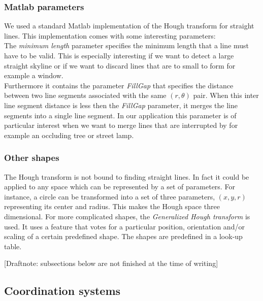 \subsubsection{Matlab parameters}
We used a standard Matlab implementation of the Hough transform for straight lines.  This implementation comes with some interesting parameters:\\

	The \emph{minimum length} parameter specifies the minimum length that a line must have to be valid. This is especially interesting if we want to detect a large straight skyline or if we want to discard lines that are to small to form for example a window.\\

	Furthermore it contains the parameter \emph{FillGap} that specifies the distance
	between two line segments associated with the same $(r, \theta)$ pair.
	When this inter line segment distance is less then the \emph{FillGap} parameter, it merges the line segments into a single line segment. In our application this parameter is of particular interest when we want to merge lines that are interrupted by for example an occluding tree or street lamp.\\


\subsubsection{Other shapes}
The Hough transform is not bound to finding straight lines. In fact it could be
applied to any space which can be represented by a set of parameters.  For
instance, a circle can be transformed into a set of three parameters, $(x,y,r)$
representing its center and radius. This makes the Hough space three
dimensional.  For more complicated shapes, the 
\emph{Generalized Hough transform} is used.
It uses a feature that votes for a particular position, orientation and/or scaling of a certain predefined shape.  The shapes are predefined in a look-up table.


[Draftnote: subsections below are not finished at the time of writing]
\subsection{Coordination systems}
%  
%  
